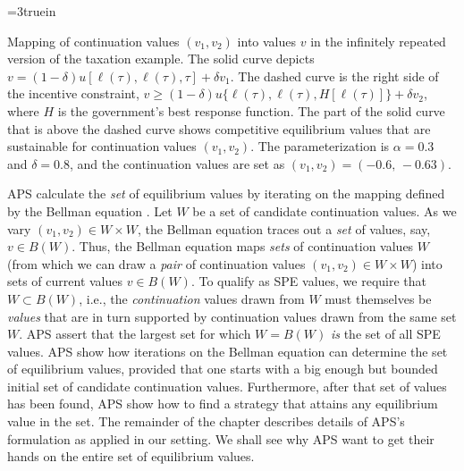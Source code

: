 
\centerline{\epsfxsize=3truein}
\caption{Mapping of continuation values $(v_1,v_2)$ into values $v$ in the
infinitely repeated version of the taxation example. The solid curve depicts
$v=(1-\delta)u[\ell(\tau),\ell(\tau),\tau]+\delta v_1$. The dashed curve is the
right side of the incentive constraint,
$v \geq (1-\delta)u\{\ell(\tau),\ell(\tau),H[\ell(\tau)]\}+\delta v_2$,
where $H$ is the government's best response function. The part of the
solid curve that is above the dashed curve shows competitive equilibrium values
that are sustainable for continuation values $(v_1,v_2)$. The parameterization
is $\alpha=0.3$ and $\delta=0.8$, and the continuation values are set as
$(v_1,v_2)=(-0.6,\,-0.63)$.}
\endfigure


APS calculate the {\it set\/} of equilibrium values by iterating
on the mapping defined by the Bellman equation . Let
$W$ be a set of candidate continuation values. As we vary
$(v_1,v_2) \in W \times W$, the Bellman equation traces out a {\it
set\/} of values, say,   $v \in B(W)$. Thus, the Bellman equation
maps {\it sets\/} of continuation values  $W$ (from which we can draw a {\it pair} of
continuation values $(v_1, v_2) \in W \times W$) into sets of current values $v \in   B(W)$.
 To qualify as SPE  values, we require
that $W \subset B(W)$, i.e., the {\it continuation\/} values drawn
from $W$ must themselves be {\it values\/}  that are in turn
supported by continuation values drawn from the same set $W.$  APS
assert that  the largest set for which $W = B(W)$ {\it is\/} the set of all
SPE values. APS show how iterations on the Bellman equation can
determine the set of equilibrium values, provided that one starts
with a big enough but bounded initial set of candidate
continuation values. Furthermore, after that set of values has
been found, APS show how to find a strategy that attains any
equilibrium value in the set.
 The remainder of the chapter describes details of
APS's formulation as applied in our setting.
We shall see   why APS want to get their hands on
the entire set of equilibrium values.

